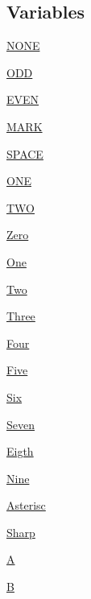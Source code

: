 \subsection*{Variables}
\begin{DoxyCompactItemize}
\item 
\hyperlink{enum_8vala_a899caa602e4fff675b17cdbab33607ec}{N\-O\-N\-E}
\item 
\hyperlink{enum_8vala_af08bd4a17e637fa6824ffe427026744d}{O\-D\-D}
\item 
\hyperlink{enum_8vala_a145aefc9eb0f54174786b9acc7854c39}{E\-V\-E\-N}
\item 
\hyperlink{enum_8vala_a40c0b1257a53cc3f1fbbe6e7dec9c4b0}{M\-A\-R\-K}
\item 
\hyperlink{enum_8vala_ae75d7b4459e07dec5aa9999730a43a38}{S\-P\-A\-C\-E}
\item 
\hyperlink{enum_8vala_a2cb8470634cc90a55800ee95f967eade}{O\-N\-E}
\item 
\hyperlink{enum_8vala_a0673b633b0851b14ed38bd96f5781290}{T\-W\-O}
\item 
\hyperlink{enum_8vala_ab7be4097d881eae846c441069ed51f24}{Zero}
\item 
\hyperlink{enum_8vala_a5fa00e7f98097a9c0c059b5308a4b863}{One}
\item 
\hyperlink{enum_8vala_ae1ebba61750a87cd3e04f7a0bcc54d41}{Two}
\item 
\hyperlink{enum_8vala_a7595488bbd935760242afd8a3a2c0dcd}{Three}
\item 
\hyperlink{enum_8vala_a3ffdf73f4d6c86cda4741740d081325c}{Four}
\item 
\hyperlink{enum_8vala_aee61276f9005313515feb62138be2b8c}{Five}
\item 
\hyperlink{enum_8vala_af327dfd1bc2e2ab345c37f6830271498}{Six}
\item 
\hyperlink{enum_8vala_a664c9d9eff9f8aedc5d91b3bc6625968}{Seven}
\item 
\hyperlink{enum_8vala_ac5a31d996f5dd33cf991970e41362b65}{Eigth}
\item 
\hyperlink{enum_8vala_abd916c08d176f7a521336059e38f4b25}{Nine}
\item 
\hyperlink{enum_8vala_a96eda96ce5ad0c1d1b6588690e70b48b}{Asterisc}
\item 
\hyperlink{enum_8vala_a2c88735882fca7962e70190bc67e5514}{Sharp}
\item 
\hyperlink{enum_8vala_a3b98e2dffc6cb06a89dcb0d5c60a0206}{A}
\item 
\hyperlink{enum_8vala_a9d3d9048db16a7eee539e93e3618cbe7}{B}
\item 

\end{DoxyCompactItemize}
